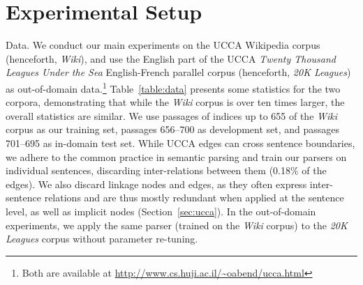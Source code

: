 \documentclass[11pt,letterpaper]{article}
\makeatletter
\newcommand{\secref}[1]{Section~\ref{#1}}
\newcommand{\tabref}[1]{Table~\ref{#1}}
\renewcommand{\paragraph}{
  \@startsection{paragraph}{4}
  {\z@}{.3ex \@plus .3ex \@minus .2ex}{-1em}
  {\normalfont\normalsize\bfseries}
}
\makeatother
\begin{document}
\section{Experimental Setup}\label{sec:exp_setup}

\paragraph{Data.}\label{sec:data}
We conduct our main experiments on the UCCA Wikipedia corpus (henceforth, \textit{Wiki}),
and use the English part of the UCCA \textit{Twenty Thousand Leagues Under the Sea} English-French parallel corpus (henceforth, \textit{20K Leagues}) as
out-of-domain data.\footnote{Both are available at \url{http://www.cs.huji.ac.il/~oabend/ucca.html}}
\tabref{table:data} presents some statistics for the two corpora, demonstrating that while
the \textit{Wiki} corpus is over ten times larger, the overall statistics are
similar.
We use passages of indices up to 655
of the \textit{Wiki} corpus as our training set, passages 656--700 as development set,
and passages 701--695 as in-domain test set.
While UCCA edges can cross sentence boundaries, we adhere to the common
practice in semantic parsing and train our parsers on individual sentences,
discarding inter-relations between them (0.18\% of the edges).
We also discard linkage nodes and edges, as they often express inter-sentence
relations and are thus mostly redundant when applied at the sentence level,
as well as implicit nodes (\secref{sec:ucca}).
In the out-of-domain experiments, we apply the same parser
(trained on the \textit{Wiki} corpus) to the \textit{20K Leagues} corpus
without parameter re-tuning.
\end{document}
